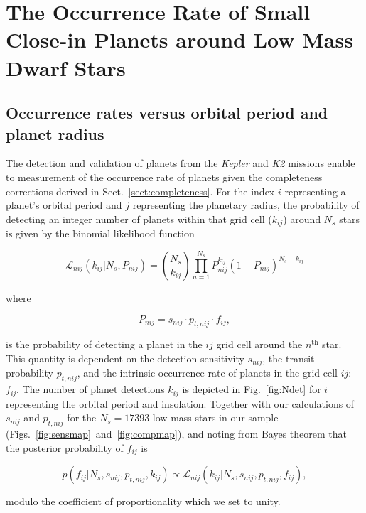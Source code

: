 \documentclass[twocolumn]{emulateapj}
\newcommand{\kepler}[1]{\emph{Kepler}#1}
\newcommand{\ktwo}[1]{\emph{K2}#1}
\begin{document}
\section{The Occurrence Rate of Small Close-in Planets around Low Mass Dwarf Stars} \label{sect:occurrence}
\subsection{Occurrence rates versus orbital period and planet radius}
The detection and validation of planets from the \kepler{} and \ktwo{} missions enable to measurement of the
occurrence rate of planets given the completeness corrections derived in Sect.~\ref{sect:completeness}.
For the index $i$ representing a planet's orbital period and $j$ representing the planetary
radius, the probability of detecting an integer number of planets within that grid cell ($k_{ij}$) around
$N_s$ stars is given by the binomial likelihood function

\begin{equation}
  \mathcal{L}_{nij}(k_{ij}|N_s,P_{nij}) = \binom{N_s}{k_{ij}} \prod_{n=1}^{N_s} P_{nij}^{k_{ij}} (1-P_{nij})^{N_s-k_{ij}}
  \label{eq:lnL}
\end{equation}

\noindent where

\begin{equation}
  P_{nij} = s_{nij} \cdot p_{t,nij} \cdot f_{ij},
\end{equation}

\noindent is the probability of detecting a planet in the $ij$ grid cell around the $n^{\text{th}}$ star.
This quantity is dependent on the detection sensitivity $s_{nij}$, the transit probability $p_{t,nij}$, and the 
intrinsic occurrence rate of planets in the grid cell $ij$: $f_{ij}$.
The number of planet detections $k_{ij}$ is depicted in Fig.~\ref{fig:Ndet} for $i$ representing the
orbital period and insolation. Together with our calculations of $s_{nij}$ and $p_{t,nij}$ for the $N_s=17393$
low mass stars in our sample (Figs.~\ref{fig:sensmap}~and~\ref{fig:compmap}), and noting from Bayes theorem
that the posterior probability of $f_{ij}$ is 

\begin{equation}
  p(f_{ij}|N_s,s_{nij},p_{t,nij},k_{ij}) \propto \mathcal{L}_{nij}(k_{ij}|N_s,s_{nij},p_{t,nij},f_{ij}),
\end{equation}
  
\noindent modulo the coefficient of proportionality which we set to unity.
\end{document}
